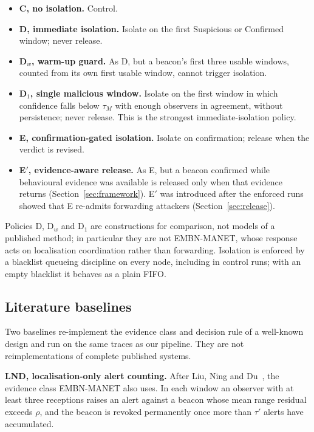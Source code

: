 \documentclass[pdflatex,sn-mathphys-num]{sn-jnl}%
\theoremstyle{thmstyleone}%
\theoremstyle{thmstyletwo}%
\theoremstyle{thmstylethree}%
\begin{document}
\begin{itemize}
\item \textbf{C, no isolation.} Control.
\item \textbf{D, immediate isolation.} Isolate on the first Suspicious or
      Confirmed window; never release.
\item \textbf{D$_w$, warm-up guard.} As D, but a beacon's first three usable
      windows, counted from its own first usable window, cannot trigger
      isolation.
\item \textbf{D$_1$, single malicious window.} Isolate on the first window in
      which confidence falls below $\tau_M$ with enough observers in
      agreement, without persistence; never release. This is the strongest
      immediate-isolation policy.
\item \textbf{E, confirmation-gated isolation.} Isolate on confirmation;
      release when the verdict is revised.
\item \textbf{E$'$, evidence-aware release.} As E, but a beacon confirmed while
      behavioural evidence was available is released only when that evidence
      returns (Section~\ref{sec:framework}). E$'$ was introduced after the
      enforced runs showed that E re-admits forwarding attackers
      (Section~\ref{sec:release}).
\end{itemize}

Policies D, D$_w$ and D$_1$ are constructions for comparison, not models of a
published method; in particular they are not EMBN-MANET, whose response acts
on localisation coordination rather than forwarding. Isolation is enforced by
a blacklist queueing discipline on every node, including in control runs;
with an empty blacklist it behaves as a plain FIFO.

\subsection{Literature baselines}
\label{sec:baselinedef}

Two baselines re-implement the evidence class and decision rule of a
well-known design and run on the same traces as our pipeline. They are not
reimplementations of complete published systems.

\textbf{LND, localisation-only alert counting.} After Liu, Ning and
Du~\cite{liu2005detecting}, the evidence class EMBN-MANET also uses. In each
window an observer with at least three receptions raises an alert against a
beacon whose mean range residual exceeds $\rho$, and the beacon is revoked
permanently once more than $\tau'$ alerts have accumulated.
\end{document}
